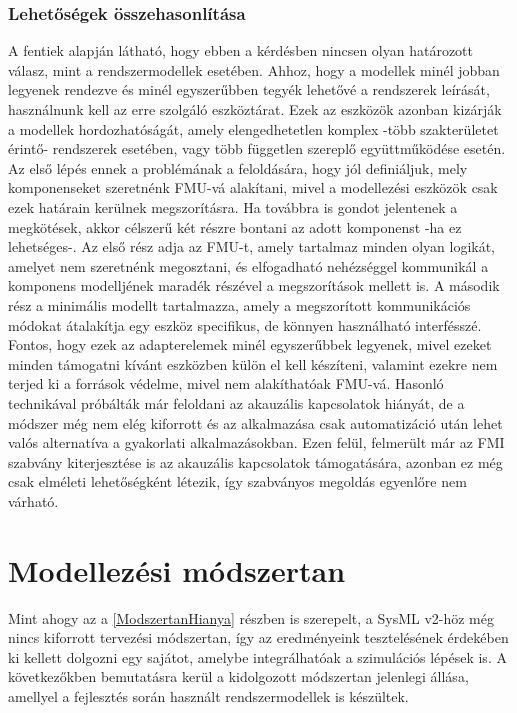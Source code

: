         \subsubsection{Lehetőségek összehasonlítása}
        A fentiek alapján látható, hogy ebben a kérdésben nincsen olyan határozott válasz, mint a rendszermodellek esetében.
        Ahhoz, hogy a modellek minél jobban legyenek rendezve és minél egyszerűbben tegyék lehetővé a rendszerek leírását, használnunk kell az erre szolgáló eszköztárat.
        Ezek az eszközök azonban kizárják a modellek hordozhatóságát, amely elengedhetetlen komplex -több szakterületet érintő- rendszerek esetében, vagy több független szereplő együttműködése esetén.
        Az első lépés ennek a problémának a feloldására, hogy jól definiáljuk, mely komponenseket szeretnénk FMU-vá alakítani, mivel a modellezési eszközök csak ezek határain kerülnek megszorításra.
        Ha továbbra is gondot jelentenek a megkötések, akkor célszerű két részre bontani az adott komponenst -ha ez lehetséges-.
        Az első rész adja az FMU-t, amely tartalmaz minden olyan logikát, amelyet nem szeretnénk megosztani, és elfogadható nehézséggel kommunikál a komponens modelljének maradék részével a megszorítások mellett is.
        A második rész a minimális modellt tartalmazza, amely a megszorított kommunikációs módokat átalakítja egy eszköz specifikus, de könnyen használható interfésszé.
        Fontos, hogy ezek az adapterelemek minél egyszerűbbek legyenek, mivel ezeket minden támogatni kívánt eszközben külön el kell készíteni, valamint ezekre nem terjed ki a források védelme, mivel nem alakíthatóak FMU-vá.
        Hasonló technikával próbálták már feloldani az akauzális kapcsolatok hiányát, de a módszer még nem elég kiforrott és az alkalmazása csak automatizáció után lehet valós alternatíva a gyakorlati alkalmazásokban. \cite{Hirano_2015}\cite{Fish2023}
        Ezen felül, felmerült már az FMI szabvány kiterjesztése is az akauzális kapcsolatok támogatására, azonban ez még csak elméleti lehetőségként létezik, így szabványos megoldás egyenlőre nem várható.

\section{Modellezési módszertan}
Mint ahogy az a \ref{ModszertanHianya} részben is szerepelt, a SysML v2-höz még nincs kiforrott tervezési módszertan, így az eredményeink tesztelésének érdekében ki kellett dolgozni egy sajátot, amelybe integrálhatóak a szimulációs lépések is.
A következőkben bemutatásra kerül a kidolgozott módszertan jelenlegi állása, amellyel a fejlesztés során használt rendszermodellek is készültek.
    
